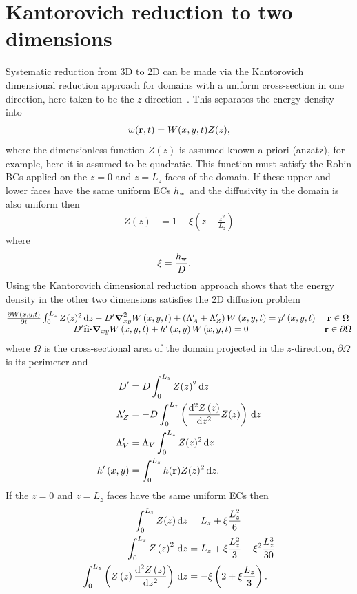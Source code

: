 \documentclass[a4paper]{article}
\numberwithin{equation}{section}
\begin{document}
\section[Kantorovich reduction to two dimensions]{Kantorovich reduction to two dimensions}
\label{sc:Kant}

Systematic reduction from 3D to 2D can be made via the Kantorovich dimensional
reduction approach for domains with a uniform cross-section in one direction,
here taken to be the $z$-direction~\citep{Sequeira2012}. This separates the energy density into
\begin{align}
w(\boldsymbol{\mathrm{r}},t) = W(x,y,t)Z(z),
\end{align}
where the dimensionless function $Z(z)$ is assumed known a-priori
(anzatz), for example, here it is assumed to be quadratic. This function must
satisfy the Robin BCs applied on the  $z=0$ and  $z=L_z$ faces of the domain.
If these upper and lower faces have the same uniform ECs $h_{\mathrm{w}}$ and the
diffusivity in the domain is also uniform then
\begin{align}
Z(z) &= 1 + \xi\left( z-\frac{z^2}{L_z} \right)
\end{align}
where
\begin{align}
\xi &= \frac{h_{\mathrm{w}}} D.
\end{align}
Using the Kantorovich dimensional reduction approach shows that the energy
density in the other two dimensions satisfies the 2D diffusion problem~\citep{Kantorovich1964}
\begin{align}
\begin{matrix}
\frac{{\partial}W\left(x,y,t\right)}{{\partial}t}
\int_0^{L_z}Z(z)^2\,\mathrm{d}{z}
- D^\prime{\boldsymbol{\mathrm{\nabla}}}_{xy}^2W\left(x,y,t\right)
+ \left(\Lambda_A^\prime+\Lambda_Z^\prime\right)W\left(x,y,t\right)
= p^\prime\left(x,y,t\right)
& \boldsymbol{\mathrm{r}}\in\Omega\\
D^\prime\widehat{\boldsymbol{\mathrm{n}}}{\boldsymbol{\mathrm{\cdot}}}{\boldsymbol{\mathrm{\nabla}}}_{xy}W\left(x,y,t\right)+h^\prime\left(x,y\right)W\left(x,y,t\right)=0
&\boldsymbol{\mathrm{r}}\in\partial\Omega
\end{matrix}
\end{align}
where $\Omega$ is the cross-sectional area of the domain projected in the
$z$-direction, $\partial\Omega$ is its perimeter and
\begin{align}
D^\prime &= D \int_0^{L_z} Z(z)^2\,\mathrm{d}{z} \\
\Lambda_Z^\prime &= -D \int_0^{L_z} \left(\frac{\mathrm{d}^2Z\left(z\right)}{\mathrm{d} z^2}Z(z)\right)\,\mathrm{d}{z} \\
\Lambda_V^\prime &= \Lambda_V \int_0^{L_z} Z(z)^2\,\mathrm{d}{z} \\
h^\prime\left(x,y\right) &= \int_0^{L_z} h(\boldsymbol{\mathrm{r}}) Z(z)^2\,\mathrm{d}{z}.
\end{align}
If the $z=0$ and $z=L_z$ faces have the same uniform ECs then
\begin{align}
\int_0^{L_z} Z(z)\,\mathrm{d}{z} &= L_z+\xi\frac{L_z^2}{6} \\
\int_0^{L_z} Z\left(z\right)^2\,\mathrm{d}{z} &= L_z+\xi\frac{L_z^2}{3}+\xi^2\frac{L_z^3}{30} \\
\int_0^{L_z} \left(Z\left(z\right)\frac{\mathrm{d}^2Z\left(z\right)}{\mathrm{d} z^2}\right)\,\mathrm{d}{z} &=-\xi\left(2+\xi \frac{L_z} 3\right).
\end{align}
\end{document}
